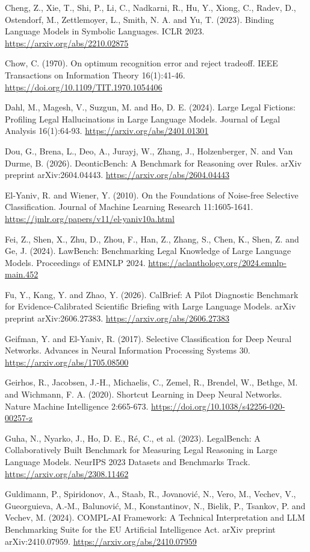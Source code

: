 \documentclass[10pt,twocolumn]{article}
\begin{document}
Cheng, Z., Xie, T., Shi, P., Li, C., Nadkarni, R., Hu, Y., Xiong, C., Radev, D., Ostendorf, M., Zettlemoyer, L., Smith, N. A. and Yu, T. (2023). Binding Language Models in Symbolic Languages. ICLR 2023. \url{https://arxiv.org/abs/2210.02875}

Chow, C. (1970). On optimum recognition error and reject tradeoff. IEEE Transactions on Information Theory 16(1):41-46. \url{https://doi.org/10.1109/TIT.1970.1054406}

Dahl, M., Magesh, V., Suzgun, M. and Ho, D. E. (2024). Large Legal Fictions: Profiling Legal Hallucinations in Large Language Models. Journal of Legal Analysis 16(1):64-93. \url{https://arxiv.org/abs/2401.01301}

Dou, G., Brena, L., Deo, A., Jurayj, W., Zhang, J., Holzenberger, N. and Van Durme, B. (2026). DeonticBench: A Benchmark for Reasoning over Rules. arXiv preprint arXiv:2604.04443. \url{https://arxiv.org/abs/2604.04443}

El-Yaniv, R. and Wiener, Y. (2010). On the Foundations of Noise-free Selective Classification. Journal of Machine Learning Research 11:1605-1641. \url{https://jmlr.org/papers/v11/el-yaniv10a.html}

Fei, Z., Shen, X., Zhu, D., Zhou, F., Han, Z., Zhang, S., Chen, K., Shen, Z. and Ge, J. (2024). LawBench: Benchmarking Legal Knowledge of Large Language Models. Proceedings of EMNLP 2024. \url{https://aclanthology.org/2024.emnlp-main.452}

Fu, Y., Kang, Y. and Zhao, Y. (2026). CalBrief: A Pilot Diagnostic Benchmark for Evidence-Calibrated Scientific Briefing with Large Language Models. arXiv preprint arXiv:2606.27383. \url{https://arxiv.org/abs/2606.27383}

Geifman, Y. and El-Yaniv, R. (2017). Selective Classification for Deep Neural Networks. Advances in Neural Information Processing Systems 30. \url{https://arxiv.org/abs/1705.08500}

Geirhos, R., Jacobsen, J.-H., Michaelis, C., Zemel, R., Brendel, W., Bethge, M. and Wichmann, F. A. (2020). Shortcut Learning in Deep Neural Networks. Nature Machine Intelligence 2:665-673. \url{https://doi.org/10.1038/s42256-020-00257-z}

Guha, N., Nyarko, J., Ho, D. E., Ré, C., et al. (2023). LegalBench: A Collaboratively Built Benchmark for Measuring Legal Reasoning in Large Language Models. NeurIPS 2023 Datasets and Benchmarks Track. \url{https://arxiv.org/abs/2308.11462}

Guldimann, P., Spiridonov, A., Staab, R., Jovanović, N., Vero, M., Vechev, V., Gueorguieva, A.-M., Balunović, M., Konstantinov, N., Bielik, P., Tsankov, P. and Vechev, M. (2024). COMPL-AI Framework: A Technical Interpretation and LLM Benchmarking Suite for the EU Artificial Intelligence Act. arXiv preprint arXiv:2410.07959. \url{https://arxiv.org/abs/2410.07959}
\end{document}
